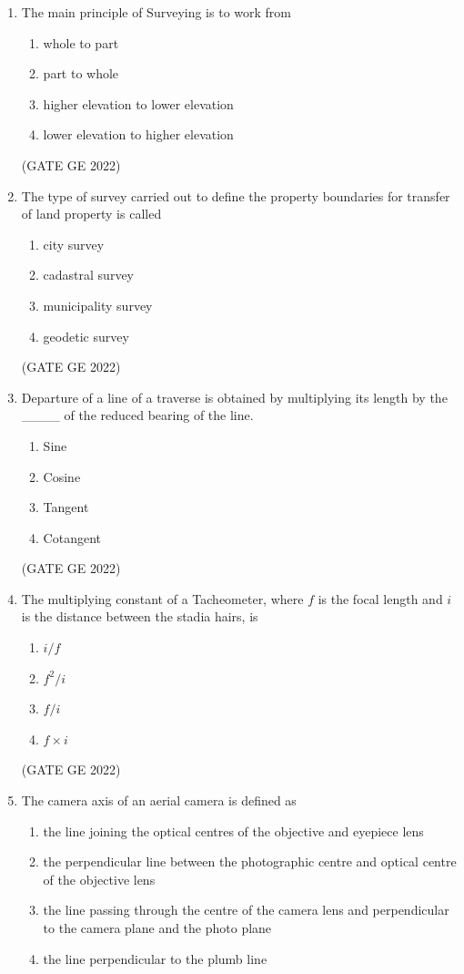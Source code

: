 \documentclass[a4paper, 11pt]{article}
\begin{document}
\begin{enumerate}
\item The main principle of Surveying is to work from
\begin{enumerate}
    \item whole to part
    \item part to whole
    \item higher elevation to lower elevation
    \item lower elevation to higher elevation
\end{enumerate}

\hfill (GATE GE 2022)

\item The type of survey carried out to define the property boundaries for transfer of land property is called
\begin{enumerate}
    \item city survey
    \item cadastral survey
    \item municipality survey
    \item geodetic survey
\end{enumerate}

\hfill (GATE GE 2022)

\item Departure of a line of a traverse is obtained by multiplying its length by the \_\_\_\_ of the reduced bearing of the line.
\begin{enumerate}
    \item Sine
    \item Cosine
    \item Tangent
    \item Cotangent
\end{enumerate}

\hfill (GATE GE 2022)

\item The multiplying constant of a Tacheometer, where $f$ is the focal length and $i$ is the distance between the stadia hairs, is
\begin{enumerate}
    \item $i/f$
    \item $f^2 / i$
    \item $f / i$
    \item $f \times i$
\end{enumerate}

\hfill (GATE GE 2022)

\item The camera axis of an aerial camera is defined as
\begin{enumerate}
    \item the line joining the optical centres of the objective and eyepiece lens
    \item the perpendicular line between the photographic centre and optical centre of the objective lens
    \item the line passing through the centre of the camera lens and perpendicular to the camera plane and the photo plane
    \item the line perpendicular to the plumb line
\end{enumerate}


\end{enumerate}
\end{document}
